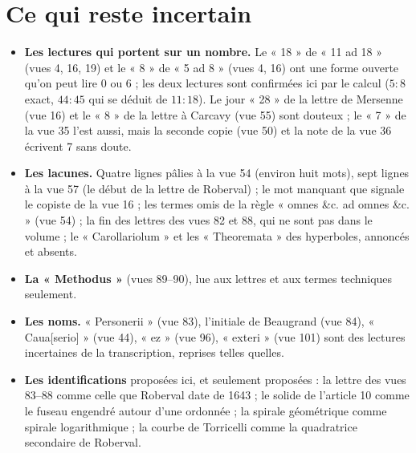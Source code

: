 \documentclass[11pt,a4paper]{article}
\begin{document}
\section*{Ce qui reste incertain}

\begin{itemize}
  \item \textbf{Les lectures qui portent sur un nombre.} Le « 18 » de « 11 ad 18 »
    (vues 4, 16, 19) et le « 8 » de « 5 ad 8 » (vues 4, 16) ont une forme ouverte
    qu'on peut lire 0 ou 6 ; les deux lectures sont confirmées ici par le calcul
    ($5:8$ exact, $44:45$ qui se déduit de $11:18$). Le jour « 28 » de la lettre
    de Mersenne (vue 16) et le « 8 » de la lettre à Carcavy (vue 55) sont
    douteux ; le « 7 » de la vue 35 l'est aussi, mais la seconde copie (vue 50)
    et la note de la vue 36 écrivent 7 sans doute.
  \item \textbf{Les lacunes.} Quatre lignes pâlies à la vue 54 (environ huit
    mots), sept lignes à la vue 57 (le début de la lettre de Roberval) ; le mot
    manquant que signale le copiste de la vue 16 ; les termes omis de la règle
    « omnes \&c. ad omnes \&c. » (vue 54) ; la fin des lettres des vues 82 et
    88, qui ne sont pas dans le volume ; le « Carollariolum » et les
    « Theoremata » des hyperboles, annoncés et absents.
  \item \textbf{La « Methodus »} (vues 89--90), lue aux lettres et aux termes
    techniques seulement.
  \item \textbf{Les noms.} « Personerii » (vue 83), l'initiale de Beaugrand
    (vue 84), « Caua[serio] » (vue 44), « ez » (vue 96), « exteri » (vue 101)
    sont des lectures incertaines de la transcription, reprises telles quelles.
  \item \textbf{Les identifications} proposées ici, et seulement proposées : la
    lettre des vues 83--88 comme celle que Roberval date de 1643 ; le solide de
    l'article 10 comme le fuseau engendré autour d'une ordonnée ; la spirale
    géométrique comme spirale logarithmique ; la courbe de Torricelli comme la
    quadratrice secondaire de Roberval.
\end{itemize}
\end{document}
